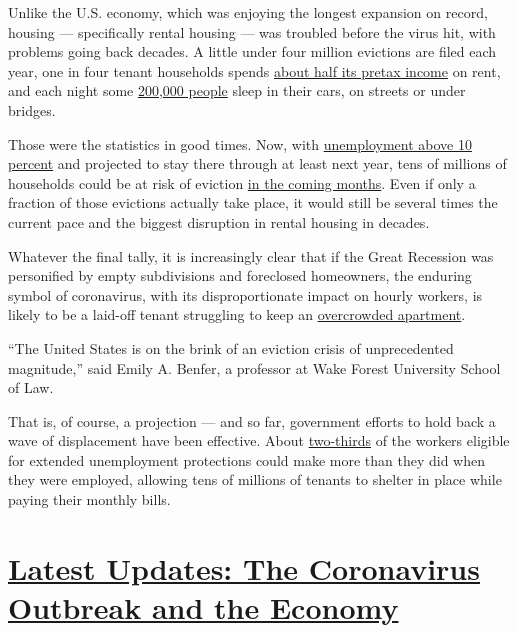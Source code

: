 Unlike the U.S. economy, which was enjoying the longest expansion on
record, housing --- specifically rental housing --- was troubled before
the virus hit, with problems going back decades. A little under four
million evictions are filed each year, one in four tenant households
spends
\href{https://www.jchs.harvard.edu/sites/default/files/Harvard_JCHS_Americas_Rental_Housing_2020.pdf}{about
half its pretax income} on rent, and each night some
\href{https://www.whitehouse.gov/wp-content/uploads/2019/09/The-State-of-Homelessness-in-America.pdf}{200,000
people} sleep in their cars, on streets or under bridges.

Those were the statistics in good times. Now, with
\href{https://www.nytimes.com/2020/08/07/world/coronavirus-covid-19.html}{unemployment
above 10 percent} and projected to stay there through at least next
year, tens of millions of households could be at risk of eviction
\href{https://nlihc.org/sites/default/files/The_Eviction_Crisis_080720.pdf}{in
the coming months}. Even if only a fraction of those evictions actually
take place, it would still be several times the current pace and the
biggest disruption in rental housing in decades.

Whatever the final tally, it is increasingly clear that if the Great
Recession was personified by empty subdivisions and foreclosed
homeowners, the enduring symbol of coronavirus, with its
disproportionate impact on hourly workers, is likely to be a laid-off
tenant struggling to keep an
\href{https://www.nytimes.com/2020/08/01/business/economy/housing-overcrowding-coronavirus.html}{overcrowded
apartment}.

``The United States is on the brink of an eviction crisis of
unprecedented magnitude,'' said Emily A. Benfer, a professor at Wake
Forest University School of Law.

That is, of course, a projection --- and so far, government efforts to
hold back a wave of displacement have been effective. About
\href{https://bfi.uchicago.edu/working-paper/2020-62/}{two-thirds} of
the workers eligible for extended unemployment protections could make
more than they did when they were employed, allowing tens of millions of
tenants to shelter in place while paying their monthly bills.

\hypertarget{latest-updates-the-coronavirus-outbreak-and-the-economy}{%
\section{\texorpdfstring{\href{https://www.nytimes.com/live/2020/08/07/business/stock-market-today-coronavirus?action=click\&pgtype=Article\&state=default\&region=MAIN_CONTENT_1\&context=storylines_live_updates}{Latest
Updates: The Coronavirus Outbreak and the
Economy}}{Latest Updates: The Coronavirus Outbreak and the Economy}}\label{latest-updates-the-coronavirus-outbreak-and-the-economy}}


